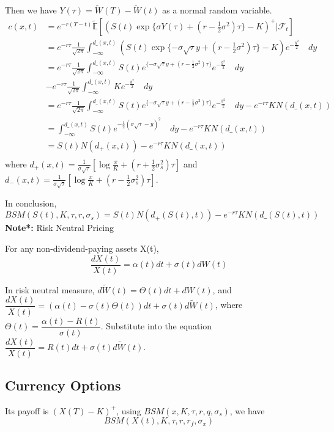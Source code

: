 \documentclass[a4]{article}
\begin{document}
Then we have $Y(\tau)=\tilde{W}(T)-\tilde{W}(t)$ as a normal random variable.
$$
\begin{aligned}
c(x,t)
&= e^{-r(T-t)}\tilde{\mathbb{E}}[(S(t)\exp\{\sigma Y(\tau) + (r-\frac{1}{2}\sigma^{2})\tau\}-K)^{+}|\mathcal{F}_{t}]\\ 
&=e^{-r\tau}\frac{1}{\sqrt{2\pi}}\int_{-\infty}^{d\_(x,t)}(S(t)\exp\{-\sigma \sqrt{\tau}y + (r-\frac{1}{2}\sigma^{2})\tau\}-K)e^{-\frac{y^{2}}{2}}\quad dy\\
&=e^{-r\tau}\frac{1}{\sqrt{2\pi}}\int_{-\infty}^{d\_(x,t)}S(t)e^{\{-\sigma \sqrt{\tau}y + (r-\frac{1}{2}\sigma^{2})\tau\}}e^{-\frac{y^{2}}{2}}\quad dy\\
&-e^{-r\tau}\frac{1}{\sqrt{2\pi}}\int_{-\infty}^{d\_(x,t)}Ke^{-\frac{y^{2}}{2}}\quad dy\\
&=e^{-r\tau}\frac{1}{\sqrt{2\pi}}\int_{-\infty}^{d\_(x,t)}S(t)e^{\{-\sigma \sqrt{\tau}y + (r-\frac{1}{2}\sigma^{2})\tau\}}e^{-\frac{y^{2}}{2}}\quad dy -e^{-r\tau}KN(d\_(x,t))\\
&=\int_{-\infty}^{d\_(x,t)}S(t)e^{-\frac{1}{2}(\sigma\sqrt{\tau}-y)^{2}}\quad dy -e^{-r\tau}KN(d\_(x,t))\\
&=S(t)N(d_{+}(x,t))-e^{-r\tau}KN(d\_(x,t))\\
\end{aligned}
$$
where $d_{+}(x,t) = \frac{1}{\sigma \sqrt{\tau}}[\log \frac{x}{K}+(r+\frac{1}{2}\sigma_{s}^{2})\tau]$ and  $d_{-}(x,t) = \frac{1}{\sigma \sqrt{\tau}}[\log \frac{x}{K}+(r-\frac{1}{2}\sigma_{s}^{2})\tau]$.\par 
\bigbreak
In conclusion, $BSM(S(t),K,\tau,r,\sigma_{s}) = S(t)N(d_{+}(S(t),t))-e^{-r\tau}KN(d\_(S(t),t))$
\bigbreak 
\noindent \textbf{Note*:} Risk Neutral Pricing\par 
For any non-dividend-paying assets X(t), $$
\dfrac{dX(t)}{X(t)} = \alpha(t)dt + \sigma(t)dW(t)
$$\par In risk neutral measure, $d\tilde{W}(t) = \Theta(t)dt + dW(t)$, and $\dfrac{dX(t)}{X(t)}=(\alpha(t) - \sigma(t)\Theta(t))dt + \sigma(t)d\tilde{W}(t)$, where $\Theta(t) = \dfrac{\alpha(t)-R(t)}{\sigma(t)}$. Substitute into the equation $\dfrac{dX(t)}{X(t)}=R(t)dt + \sigma(t)d\tilde{W}(t)$.
\subsection{Currency Options}
Its payoff is $(X(T)-K)^{+}$, using $BSM(x,K,\tau,r, q,\sigma_{s})$, we have
$$
BSM(X(t),K,\tau,r, r_{f},\sigma_{x})
$$
\end{document}
